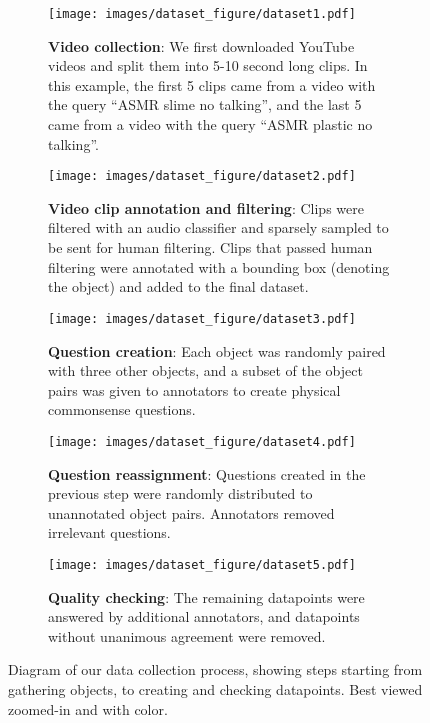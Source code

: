 \documentclass[runningheads]{llncs}
\begin{document}
\begin{figure}[t!]
\begin{framed}
    \centering
\begin{subfigure}{\textwidth}
        \centering
        \caption{\textbf{Video collection}: We first downloaded YouTube videos and split them into 5-10 second long clips. In this example, the first 5 clips came from a video with the query ``ASMR slime no talking'', and the last 5 came from a video with the query ``ASMR plastic no talking''.}
\texttt{[image: images/dataset\_figure/dataset1.pdf]}
    \end{subfigure} 
    \begin{subfigure}{\textwidth}
        \centering
        \caption{\textbf{Video clip annotation and filtering}: Clips were filtered with an audio classifier and sparsely sampled to be sent for human filtering. Clips that passed human filtering were annotated with a bounding box (denoting the object) and added to the final dataset.} 
\texttt{[image: images/dataset\_figure/dataset2.pdf]}
\end{subfigure}
    \begin{subfigure}{\textwidth}
        \centering
        \caption{\textbf{Question creation}: Each object was randomly paired with three other objects, and a subset of the object pairs was given to annotators to create physical commonsense questions.} 
\texttt{[image: images/dataset\_figure/dataset3.pdf]}
\end{subfigure}
    \begin{subfigure}[b]{0.48\textwidth}
        \centering
        \caption{\textbf{Question reassignment}: Questions created in the previous step were randomly distributed to unannotated object pairs. Annotators removed irrelevant questions.}
\texttt{[image: images/dataset\_figure/dataset4.pdf]}
    \end{subfigure}
    \hfill
    \begin{subfigure}[b]{0.48\textwidth}
        \centering
        \caption{\textbf{Quality checking}: The remaining datapoints were answered by additional annotators, and datapoints without unanimous agreement were removed. } 
\texttt{[image: images/dataset\_figure/dataset5.pdf]}
    \end{subfigure}
\end{framed}
\caption{Diagram of our data collection process, showing steps starting from gathering objects, to creating and checking datapoints. Best viewed zoomed-in and with color.}
\label{fig:dataset_pipeline}
\end{figure}
\end{document}

